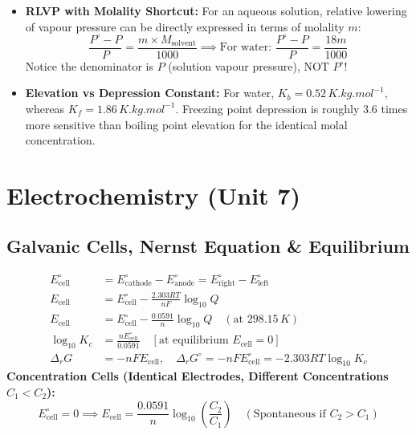 \documentclass[10pt,twoside,openright]{book}
\begin{document}
\begin{trapbox}
\begin{itemize}
  \item \textbf{RLVP with Molality Shortcut:} For an aqueous solution, relative lowering of vapour pressure can be directly expressed in terms of molality $m$:
  \begin{equation*}
    \frac{P^\circ - P}{P} = \frac{m \times M_{\text{solvent}}}{1000} \implies \text{For water: } \frac{P^\circ - P}{P} = \frac{18 m}{1000}
  \end{equation*}
  Notice the denominator is $P$ (solution vapour pressure), NOT $P^\circ$!
  \item \textbf{Elevation vs Depression Constant:} For water, $K_b = 0.52\,\si{K.kg.mol^{-1}}$, whereas $K_f = 1.86\,\si{K.kg.mol^{-1}}$. Freezing point depression is roughly 3.6 times more sensitive than boiling point elevation for the identical molal concentration.
\end{itemize}
\end{trapbox}

\newpage

\section{Electrochemistry (Unit 7)}

\subsection{Galvanic Cells, Nernst Equation \& Equilibrium}

\begin{formulabox}
\begin{align}
  E_{\text{cell}}^\circ &= E_{\text{cathode}}^\circ - E_{\text{anode}}^\circ = E_{\text{right}}^\circ - E_{\text{left}}^\circ \\
  E_{\text{cell}} &= E_{\text{cell}}^\circ - \frac{2.303 R T}{n F}\log_{10} Q \\
  E_{\text{cell}} &= E_{\text{cell}}^\circ - \frac{0.0591}{n}\log_{10} Q \quad (\text{at } 298.15\,\si{K}) \\
  \log_{10} K_c &= \frac{n E_{\text{cell}}^\circ}{0.0591} \quad [\text{at equilibrium } E_{\text{cell}} = 0] \\
  \Delta_r G &= -n F E_{\text{cell}}, \quad \Delta_r G^\circ = -n F E_{\text{cell}}^\circ = -2.303 R T \log_{10} K_c
\end{align}
\textbf{Concentration Cells (Identical Electrodes, Different Concentrations $C_1 < C_2$):}
\begin{equation}
  E_{\text{cell}}^\circ = 0 \implies E_{\text{cell}} = \frac{0.0591}{n}\log_{10}\left(\frac{C_2}{C_1}\right) \quad (\text{Spontaneous if } C_2 > C_1)
\end{equation}
\end{formulabox}
\end{document}
